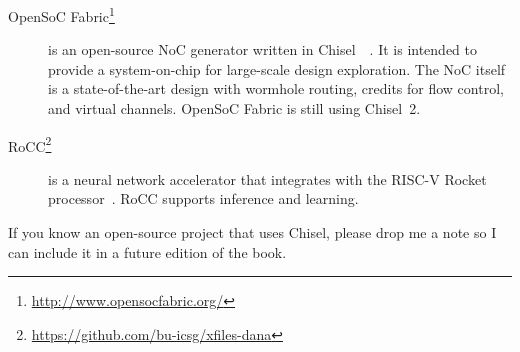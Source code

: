 \documentclass[%
    10pt,
    headinclude, footexclude,
    openright, %
    notitlepage,
    cleardoubleempty,
    headsepline,
    pointlessnumbers,
    bibtotoc, idxtotoc,
    ]{scrbook}
\newcommand{\myref}[2]{\href{#1}{#2}}
\renewcommand{\myref}[2]{{#2}{\footnote{\url{#1}}}}
\begin{document}
\begin{description}
\item[\myref{http://www.opensocfabric.org/}{OpenSoC Fabric}] is an open-source NoC
generator written in Chisel~~\cite{OpenSoC:ispass2016}. It is intended to provide a
system-on-chip for large-scale design exploration. The NoC itself is a state-of-the-art design with wormhole routing, credits for flow control, and virtual channels.
OpenSoC Fabric is still using Chisel~2.

\item[\myref{https://github.com/bu-icsg/xfiles-dana}{RoCC}] is a neural network accelerator
that integrates with the RISC-V Rocket processor~\cite{RoCC:2015}.
RoCC supports inference and learning.

\end{description}

If you know an open-source project that uses Chisel, please drop me a note
so I can include it in a future edition of the book.



\end{document}
